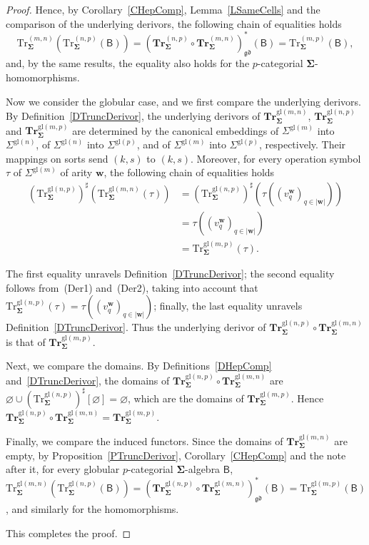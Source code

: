 \documentclass[a4paper, reqno
]{amsart}
\newcommand{\bb}[1]{\ensuremath{\lvert #1 \rvert}}
\newcommand{\sig}[1]{\mathbf{#1}}             %
\newcommand{\calg}[1]{\boldsymbol{\mathsf{#1}}} %
\newcommand{\gd}{\mathfrak{gd}}              %
\newcommand{\gl}{\mathrm{gl}}                %
\newcommand{\Tr}{\mathrm{Tr}}
\newcommand{\bTr}{\mathbf{Tr}}
\theoremstyle{plain}
\theoremstyle{definition}
\begin{document}
\begin{proof}
Hence, by Corollary~\ref{CHepComp}, Lemma~\ref{LSameCells} and the comparison of the underlying derivors, the following chain of equalities holds
$$
\Tr^{(m,n)}_{\sig{\Sigma}}\left(\Tr^{(n,p)}_{\sig{\Sigma}}(\calg{B})\right)
=
\left(\bTr^{(n,p)}_{\sig{\Sigma}}\circ\bTr^{(m,n)}_{\sig{\Sigma}}\right)^{\ast}_{\gd}(\calg{B})
=
\Tr^{(m,p)}_{\sig{\Sigma}}(\calg{B}),
$$
and, by the same results, the equality also holds for the $p$-categorial $\sig{\Sigma}$-homomorphisms.

Now we consider the globular case, and we first compare the underlying derivors.
By Definition~\ref{DTruncDerivor}, the underlying derivors of $\bTr^{\gl(m,n)}_{\sig{\Sigma}}$, $\bTr^{\gl(n,p)}_{\sig{\Sigma}}$ and $\bTr^{\gl(m,p)}_{\sig{\Sigma}}$ are determined by the canonical embeddings of $\Sigma^{\gl(m)}$ into $\Sigma^{\gl(n)}$, of $\Sigma^{\gl(n)}$ into $\Sigma^{\gl(p)}$, and of $\Sigma^{\gl(m)}$ into $\Sigma^{\gl(p)}$, respectively.
Their mappings on sorts send $(k,s)$ to $(k,s)$.
Moreover, for every operation symbol $\tau$ of $\Sigma^{\gl(m)}$ of arity $\mathbf{w}$, the following chain of equalities holds
\begin{align*}
\left(\Tr^{\gl(n,p)}_{\sig{\Sigma}}\right)^{\sharp}\left(\Tr^{\gl(m,n)}_{\sig{\Sigma}}(\tau)\right)
&=
\left(\Tr^{\gl(n,p)}_{\sig{\Sigma}}\right)^{\sharp}\left(\tau\left((v^{\mathbf{w}}_{q})_{q\in\bb{\mathbf{w}}}\right)\right)
\tag{1}
\\&=
\tau\left((v^{\mathbf{w}}_{q})_{q\in\bb{\mathbf{w}}}\right)
\tag{2}
\\&=
\Tr^{\gl(m,p)}_{\sig{\Sigma}}(\tau).
\tag{3}
\end{align*}

The first equality unravels Definition~\ref{DTruncDerivor}; the second equality follows from~(Der1) and~(Der2), taking into account that $\Tr^{\gl(n,p)}_{\sig{\Sigma}}(\tau)=\tau((v^{\mathbf{w}}_{q})_{q\in\bb{\mathbf{w}}})$; finally, the last equality unravels Definition~\ref{DTruncDerivor}.
Thus the underlying derivor of $\bTr^{\gl(n,p)}_{\sig{\Sigma}}\circ\bTr^{\gl(m,n)}_{\sig{\Sigma}}$ is that of $\bTr^{\gl(m,p)}_{\sig{\Sigma}}$.

Next, we compare the domains.
By Definitions~\ref{DHepComp} and~\ref{DTruncDerivor}, the domains of $\bTr^{\gl(n,p)}_{\sig{\Sigma}}\circ\bTr^{\gl(m,n)}_{\sig{\Sigma}}$ are $\varnothing\cup(\Tr^{\gl(n,p)}_{\sig{\Sigma}})^{\sharp}[\varnothing]=\varnothing$, which are the domains of $\bTr^{\gl(m,p)}_{\sig{\Sigma}}$.
Hence $\bTr^{\gl(n,p)}_{\sig{\Sigma}}\circ\bTr^{\gl(m,n)}_{\sig{\Sigma}}=\bTr^{\gl(m,p)}_{\sig{\Sigma}}$.

Finally, we compare the induced functors.
Since the domains of $\bTr^{\gl(m,n)}_{\sig{\Sigma}}$ are empty, by Proposition~\ref{PTruncDerivor}, Corollary~\ref{CHepComp} and the note after it, for every globular $p$-categorial $\sig{\Sigma}$-algebra $\calg{B}$, $\Tr^{\gl(m,n)}_{\sig{\Sigma}}(\Tr^{\gl(n,p)}_{\sig{\Sigma}}(\calg{B}))=(\bTr^{\gl(n,p)}_{\sig{\Sigma}}\circ\bTr^{\gl(m,n)}_{\sig{\Sigma}})^{\ast}_{\gd}(\calg{B})=\Tr^{\gl(m,p)}_{\sig{\Sigma}}(\calg{B})$, and similarly for the homomorphisms.

This completes the proof.
\end{proof}
\end{document}
